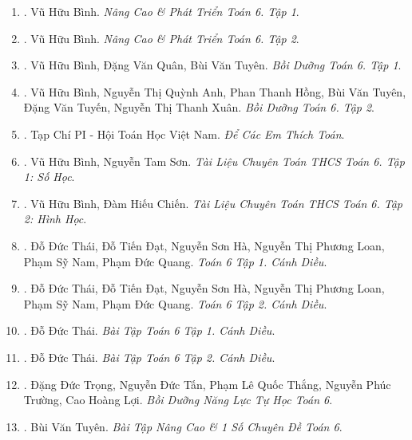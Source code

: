 \documentclass{article}
\begin{document}
\begin{enumerate}
	\item \cite{Binh_Toan_6_tap_1}. {\sc Vũ Hữu Bình}. {\it Nâng Cao \& Phát Triển Toán 6. Tập 1}.\hfill{\sf[done]}
	
	\item \cite{Binh_Toan_6_tap_2}. {\sc Vũ Hữu Bình}. {\it Nâng Cao \& Phát Triển Toán 6. Tập 2}.\hfill{\sf[done]}
	
	\item \cite{Binh_boi_duong_Toan_6_tap_1}. {\sc Vũ Hữu Bình, Đặng Văn Quân, Bùi Văn Tuyên}. {\it Bồi Dưỡng Toán 6. Tập 1}.\hfill{\sf[done]}
	
	\item \cite{Binh_boi_duong_Toan_6_tap_2}. {\sc Vũ Hữu Bình, Nguyễn Thị Quỳnh Anh, Phan Thanh Hồng, Bùi Văn Tuyên, Đặng Văn Tuyến, Nguyễn Thị Thanh Xuân}. {\it Bồi Dưỡng Toán 6. Tập 2}.\hfill{\sf[done]}
	
	\item \cite{PI_thich_toan}. {\sc Tạp Chí PI - Hội Toán Học Việt Nam}. {\it Để Các Em Thích Toán}.\hfill{\sf[reading]}
	
	\item \cite{TLCT_THCS_Toan_6_so_hoc}. {\sc Vũ Hữu Bình, Nguyễn Tam Sơn}. {\it Tài Liệu Chuyên Toán THCS Toán 6. Tập 1: Số Học}.\hfill{\sf[done]}
	
	\item \cite{TLCT_THCS_Toan_6_hinh_hoc}. {\sc Vũ Hữu Bình, Đàm Hiếu Chiến}. {\it Tài Liệu Chuyên Toán THCS Toán 6. Tập 2: Hình Học}.\hfill{\sf[done]}
	
	\item \cite{SGK_Toan_6_Canh_Dieu_tap_1}. {\sc Đỗ Đức Thái, Đỗ Tiến Đạt, Nguyễn Sơn Hà, Nguyễn Thị Phương Loan, Phạm Sỹ Nam, Phạm Đức Quang}. {\it Toán 6 Tập 1. Cánh Diều}.\hfill{\sf[done]}
	
	\item \cite{SGK_Toan_6_Canh_Dieu_tap_2}. {\sc Đỗ Đức Thái, Đỗ Tiến Đạt, Nguyễn Sơn Hà, Nguyễn Thị Phương Loan, Phạm Sỹ Nam, Phạm Đức Quang}. {\it Toán 6 Tập 2. Cánh Diều}.\hfill{\sf[done]}
	
	\item \cite{SBT_Toan_6_Canh_Dieu_tap_1}. {\sc Đỗ Đức Thái}. {\it Bài Tập Toán 6 Tập 1. Cánh Diều}.\hfill{\sf[done]}
	
	\item \cite{SBT_Toan_6_Canh_Dieu_tap_2}. {\sc Đỗ Đức Thái}. {\it Bài Tập Toán 6 Tập 2. Cánh Diều}.\hfill{\sf[done]}
	
	\item \cite{Trong_Toan_6}. {\sc Đặng Đức Trọng, Nguyễn Đức Tấn, Phạm Lê Quốc Thắng, Nguyễn Phúc Trường, Cao Hoàng Lợi}. {\it Bồi Dưỡng Năng Lực Tự Học Toán 6}.\hfill{\sf[reading]}
	
	\item \cite{Tuyen_Toan_6}. {\sc Bùi Văn Tuyên}. {\it Bài Tập Nâng Cao \& 1 Số Chuyên Đề Toán 6}.\hfill{\sf[done]}
\end{enumerate}
\end{document}

